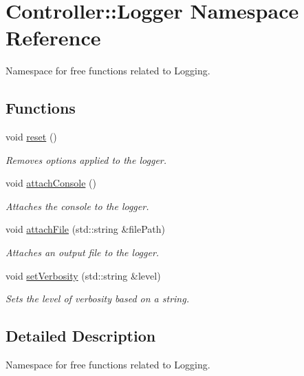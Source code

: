 \hypertarget{namespaceController_1_1Logger}{}\section{Controller\+::Logger Namespace Reference}
\label{namespaceController_1_1Logger}


Namespace for free functions related to Logging.  


\subsection*{Functions}
\begin{DoxyCompactItemize}
\item 
void \mbox{\hyperlink{namespaceController_1_1Logger_af6dad87d5575525f3ab749ead10da772}{reset}} ()
\begin{DoxyCompactList}\small\item\em Removes options applied to the logger. \end{DoxyCompactList}\item 
void \mbox{\hyperlink{namespaceController_1_1Logger_ac59dfc82da6b3803faae8bbab0fba789}{attach\+Console}} ()
\begin{DoxyCompactList}\small\item\em Attaches the console to the logger. \end{DoxyCompactList}\item 
void \mbox{\hyperlink{namespaceController_1_1Logger_a30f74b95beb503c15cbca331bf9e229d}{attach\+File}} (std\+::string \&file\+Path)
\begin{DoxyCompactList}\small\item\em Attaches an output file to the logger. \end{DoxyCompactList}\item 
void \mbox{\hyperlink{namespaceController_1_1Logger_a4d446defe9f1cd8fa09b3bc042001c18}{set\+Verbosity}} (std\+::string \&level)
\begin{DoxyCompactList}\small\item\em Sets the level of verbosity based on a string. \end{DoxyCompactList}\end{DoxyCompactItemize}


\subsection{Detailed Description}
Namespace for free functions related to Logging. 


